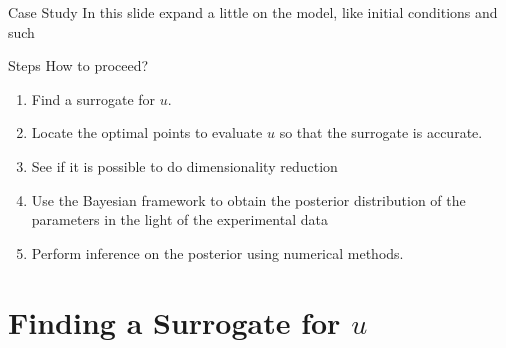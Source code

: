 \documentclass[11pt]{beamer}
\theoremstyle{plain}
\theoremstyle{definition}
\begin{document}
\begin{frame}{Case Study}
In this slide expand a little on the model,
like initial conditions and such
\end{frame}


\begin{frame}{Steps}
How to proceed?
\begin{enumerate}
\item Find a surrogate for $u$.
\item Locate the optimal points to evaluate $u$ so that the surrogate is accurate.
\item See if it is possible to do dimensionality reduction
\item Use the Bayesian framework to obtain the posterior distribution of the parameters 
in the light of the experimental data
\item Perform inference on the posterior using numerical methods.
\end{enumerate}
\end{frame}  


\section{Finding a Surrogate for $u$}
\end{document}
